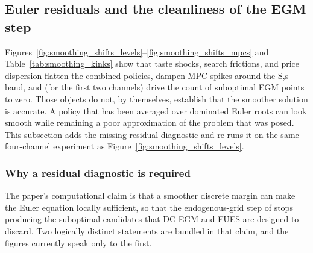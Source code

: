 
\subsection{Euler residuals and the cleanliness of the EGM step}
\label{subsec:ModelBasicEuler}

Figures~\ref{fig:smoothing_shifts_levels}--\ref{fig:smoothing_shifts_mpcs} and Table~\ref{tab:smoothing_kinks} show that taste shocks, search frictions, and price dispersion flatten the combined policies, dampen MPC spikes around the S,s band, and (for the first two channels) drive the count of suboptimal EGM points to zero. Those objects do not, by themselves, establish that the smoother solution is accurate. A policy that has been averaged over dominated Euler roots can look smooth while remaining a poor approximation of the problem that was posed. This subsection adds the missing residual diagnostic and re-runs it on the same four-channel experiment as Figure~\ref{fig:smoothing_shifts_levels}.

\subsubsection{Why a residual diagnostic is required}

The paper's computational claim is that a smoother discrete margin can make the Euler equation locally sufficient, so that the endogenous-grid step of \citet{Carroll2006-mv} stops producing the suboptimal candidates that DC-EGM \citep{Iskhakov2017-jb} and FUES \citep{Dobrescu2022-ii} are designed to discard. Two logically distinct statements are bundled in that claim, and the figures currently speak only to the first.


